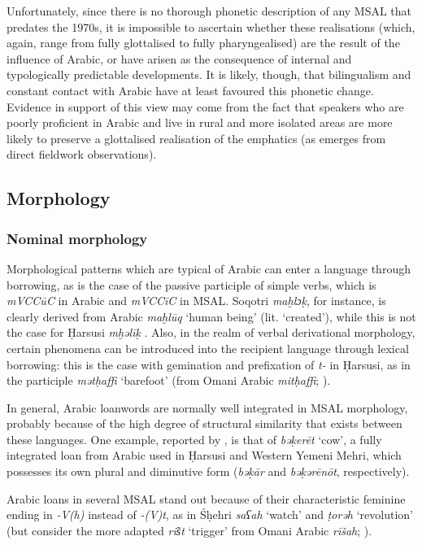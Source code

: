 \documentclass[output=paper]{langsci/langscibook}
\begin{document}
Unfortunately, since there is no thorough phonetic description of any MSAL that predates the 1970s, it is impossible to ascertain whether these realisations (which, again, range from fully glottalised to fully pharyngealised) are the result of the influence of Arabic, or have arisen as the consequence of internal and typologically predictable developments. It is likely, though, that bilingualism and constant contact with Arabic have at least favoured this phonetic change. Evidence in support of this view may come from the fact that speakers who are poorly proficient in Arabic and live in rural and more isolated areas are more likely to preserve a glottalised realisation of the emphatics (as emerges from direct fieldwork observations).


 
 \subsection{Morphology} 
 \subsubsection{Nominal morphology}\label{sec:key:nomorph}

Morphological patterns which are typical of Arabic can enter a language through borrowing, as is the case of the passive participle of simple verbs, which is \textit{mVCCūC} in Arabic and \textit{mVCCīC} in MSAL. Soqotri \textit{maḫlɔḳ}, for instance, is clearly derived from Arabic \textit{maḫlūq} ‘human being’ (lit. ‘created’), while this is not the case for Ḥarsusi \textit{mḫəlīḳ} \citep[299]{Lonnet2011}. Also, in the realm of verbal derivational morphology, certain phenomena can be introduced into the recipient language through lexical borrowing: this is the case with gemination and prefixation of \textit{t-} in Ḥarsusi, as in the participle \textit{mətḥaffi} ‘barefoot’ (from Omani Arabic \textit{mitḥaffi}; \citealt{Lonnet2011}).

In general, Arabic loanwords are normally well integrated in MSAL morphology, probably because of the high degree of structural similarity that exists between these languages. One example, reported by \citet{Lonnet2011}, is that of \textit{bəḳerēt} ‘cow’, a fully integrated loan from Arabic used in Ḥarsusi and Western Yemeni Mehri, which possesses its own plural and diminutive form (\textit{bəḳār} and \textit{bəḳərēnōt}, respectively).

Arabic loans in several MSAL stand out because of their characteristic feminine ending in \textit{-V(h)} instead of \textit{-(V)t}, as in Śḥehri \textit{saʕah} ‘watch’ and \textit{ṭorəh} ‘revolution’ (but consider the more adapted \textit{ris͂t} ‘trigger’ from Omani Arabic \textit{rīšah}; \citealt{Lonnet2011}). 
\end{document}
